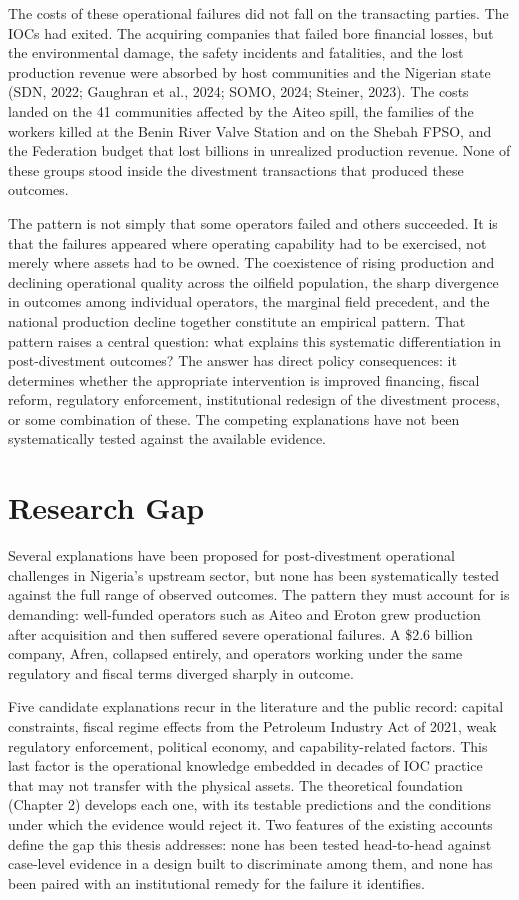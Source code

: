 The costs of these operational failures did not fall on the transacting
parties. The IOCs had exited. The acquiring companies that failed bore
financial losses, but the environmental damage, the safety incidents and
fatalities, and the lost production revenue were absorbed by host
communities and the Nigerian state (SDN, 2022; Gaughran et al., 2024;
SOMO, 2024; Steiner, 2023). The costs landed on the 41 communities
affected by the Aiteo spill, the families of the workers killed at the
Benin River Valve Station and on the Shebah FPSO, and the Federation
budget that lost billions in unrealized production revenue. None of
these groups stood inside the divestment transactions that produced
these outcomes.

The pattern is not simply that some operators failed and others
succeeded. It is that the failures appeared where operating capability
had to be exercised, not merely where assets had to be owned. The
coexistence of rising production and declining operational quality
across the oilfield population, the sharp divergence in outcomes among
individual operators, the marginal field precedent, and the national
production decline together constitute an empirical pattern. That
pattern raises a central question: what explains this systematic
differentiation in post-divestment outcomes? The answer has direct
policy consequences: it determines whether the appropriate intervention
is improved financing, fiscal reform, regulatory enforcement,
institutional redesign of the divestment process, or some combination of
these. The competing explanations have not been systematically tested
against the available evidence.

\hypertarget{research-gap}{%
\section{Research Gap}\label{research-gap}}

Several explanations have been proposed for post-divestment operational
challenges in Nigeria's upstream sector, but none has been
systematically tested against the full range of observed outcomes. The
pattern they must account for is demanding: well-funded operators such
as Aiteo and Eroton grew production after acquisition and then suffered
severe operational failures. A \$2.6 billion company, Afren, collapsed
entirely, and operators working under the same regulatory and fiscal
terms diverged sharply in outcome.

Five candidate explanations recur in the literature and the public
record: capital constraints, fiscal regime effects from the Petroleum
Industry Act of 2021, weak regulatory enforcement, political economy,
and capability-related factors. This last factor is the operational
knowledge embedded in decades of IOC practice that may not transfer with
the physical assets. The theoretical foundation (Chapter 2) develops
each one, with its testable predictions and the conditions under which
the evidence would reject it. Two features of the existing accounts
define the gap this thesis addresses: none has been tested head-to-head
against case-level evidence in a design built to discriminate among
them, and none has been paired with an institutional remedy for the
failure it identifies.

